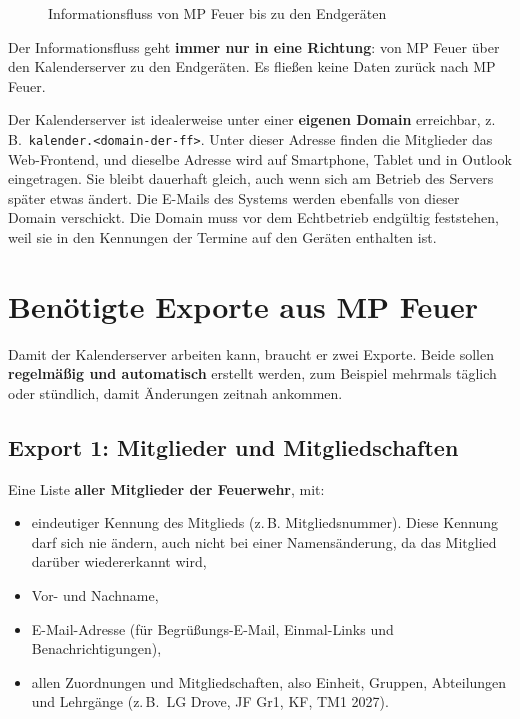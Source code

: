 \documentclass[a4paper,fontsize=10pt]{scrartcl}
\begin{document}
\begin{figure}[h]
\caption{Informationsfluss von MP Feuer bis zu den Endgeräten}
\end{figure}

Der Informationsfluss geht \textbf{immer nur in eine Richtung}: von MP Feuer
über den Kalenderserver zu den Endgeräten. Es fließen keine Daten zurück
nach MP Feuer.

Der Kalenderserver ist idealerweise unter einer \textbf{eigenen Domain}
erreichbar, z.\,B.\ \texttt{kalender.<domain-der-ff>}. Unter dieser Adresse
finden die Mitglieder das Web-Frontend, und dieselbe Adresse wird auf
Smartphone, Tablet und in Outlook eingetragen. Sie bleibt dauerhaft gleich,
auch wenn sich am Betrieb des Servers später etwas ändert. Die E-Mails des
Systems werden ebenfalls von dieser Domain verschickt. Die Domain muss vor dem
Echtbetrieb endgültig feststehen, weil sie in den Kennungen der Termine auf
den Geräten enthalten ist.

\section{Benötigte Exporte aus MP Feuer}

Damit der Kalenderserver arbeiten kann, braucht er zwei Exporte. Beide sollen
\textbf{regelmäßig und automatisch} erstellt werden, zum Beispiel mehrmals
täglich oder stündlich, damit Änderungen zeitnah ankommen.

\subsection*{Export 1: Mitglieder und Mitgliedschaften}

Eine Liste \textbf{aller Mitglieder der Feuerwehr}, mit:
\begin{itemize}
  \item eindeutiger Kennung des Mitglieds (z.\,B. Mitgliedsnummer). Diese
        Kennung darf sich nie ändern, auch nicht bei einer Namensänderung,
        da das Mitglied darüber wiedererkannt wird,
  \item Vor- und Nachname,
  \item E-Mail-Adresse (für Begrüßungs-E-Mail, Einmal-Links und
        Benachrichtigungen),
  \item allen Zuordnungen und Mitgliedschaften, also Einheit, Gruppen,
        Abteilungen und Lehrgänge (z.\,B.\ LG Drove, JF Gr1, KF, TM1 2027).
\end{itemize}
\end{document}
